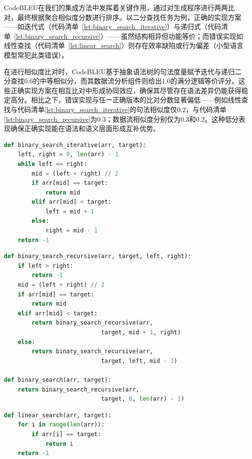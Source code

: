 \documentclass{article}
\begin{document}
\begin{CJK*}{UTF8}{gbsn}
CodeBLEU在我们的集成方法中发挥着关键作用，通过对生成程序进行两两比对，最终根据聚合相似度分数进行排序。以二分查找任务为例，正确的实现方案——如迭代式（代码清单~\ref{lst:binary_search_iterative}）与递归式（代码清单~\ref{lst:binary_search_recursive}）——虽然结构相异但功能等价；而错误实现如线性查找（代码清单~\ref{lst:linear_search}）则存在效率缺陷或行为偏差（小型语言模型常犯此类错误）。

在进行相似度比对时，CodeBLEU基于抽象语法树的句法度量赋予迭代与递归二分查找0.6的中等相似分，而其数据流分析组件则给出1.0的满分逻辑等价评分。这些正确实现方案在相互比对中形成协同效应，确保其尽管存在语法差异仍能获得稳定高分。相比之下，错误实现与任一正确版本的比对分数显著偏低——例如线性查找与代码清单\ref{lst:binary_search_iterative}的句法相似度仅0.2，与代码清单\ref{lst:binary_search_recursive}为0.3；数据流相似度分别仅为0.3和0.2。这种低分表现确保正确实现能在语法和语义层面形成互补优势。

\begin{lstlisting}[language=Python, caption={Iterative Binary Search Implementation}, label={lst:binary_search_iterative}]
def binary_search_iterative(arr, target):
    left, right = 0, len(arr) - 1
    while left <= right:
        mid = (left + right) // 2
        if arr[mid] == target:
            return mid
        elif arr[mid] < target:
            left = mid + 1
        else:
            right = mid - 1
    return -1
\end{lstlisting}

\begin{lstlisting}[language=Python, caption={Recursive Binary Search Implementation}, label={lst:binary_search_recursive}]
def binary_search_recursive(arr, target, left, right):
    if left > right:
        return -1
    mid = (left + right) // 2
    if arr[mid] == target:
        return mid
    elif arr[mid] < target:
        return binary_search_recursive(arr,
                            target, mid + 1, right)
    else:
        return binary_search_recursive(arr,
                            target, left, mid - 1)

def binary_search(arr, target):
    return binary_search_recursive(arr,
                            target, 0, len(arr) - 1)
\end{lstlisting}

\begin{lstlisting}[language=Python, caption={Linear Search Implementation (Incorrect, as the task requires a Binary Search algorithm)}, label={lst:linear_search}]
def linear_search(arr, target):
    for i in range(len(arr)):
        if arr[i] == target:
            return i
    return -1
\end{lstlisting}


\end{CJK*}
\end{document}
